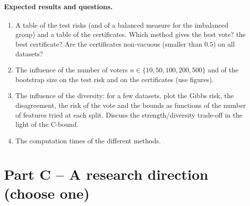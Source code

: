 \documentclass[11pt]{article}
\begin{document}
\paragraph{Expected results and questions.}
\begin{enumerate}
\item A table of the test risks (and of a balanced measure for the imbalanced group) and a table of the
      certificates. Which method gives the best vote? the best certificate? Are the certificates non-vacuous
      (smaller than $0.5$) on all datasets?
\item The influence of the number of voters $n\in\{10,50,100,200,500\}$ and of the bootstrap size on the test
      risk and on the certificates (use figures).
\item The influence of the diversity: for a few datasets, plot the Gibbs risk, the disagreement, the risk of the
      vote and the bounds as functions of the number of features tried at each split. Discuss the
      strength/diversity trade-off in the light of the C-bound.
\item The computation times of the different methods.
\end{enumerate}

\section{Part C -- A research direction (choose one)}
\end{document}
